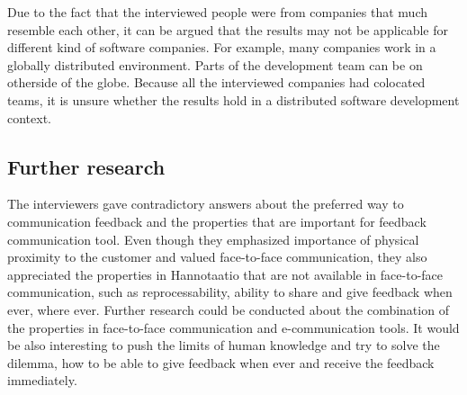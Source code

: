 \documentclass[english,12pt,a4paper,pdftex]{article}
\begin{document}
Due to the fact that the interviewed people were from companies that much resemble each other, it can be argued that the results may not be applicable for different kind of software companies. For example, many companies work in a globally distributed environment. Parts of the development team can be on otherside of the globe. Because all the interviewed companies had colocated teams, it is unsure whether the results hold in a distributed software development context.

\subsection{Further research}

The interviewers gave contradictory answers about the preferred way to communication feedback and the properties that are important for feedback communication tool. Even though they emphasized importance of physical proximity to the customer and valued face-to-face communication, they also appreciated the properties in Hannotaatio that are not available in face-to-face communication, such as reprocessability, ability to share and give feedback when ever, where ever. Further research could be conducted about the combination of the properties in face-to-face communication and e-communication tools. It would be also interesting to push the limits of human knowledge and try to solve the dilemma, how to be able to give feedback when ever and receive the feedback immediately.
\end{document}

